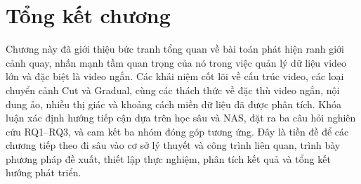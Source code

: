 \section{Tổng kết chương}
Chương này đã giới thiệu bức tranh tổng quan về bài toán phát hiện ranh giới cảnh quay, nhấn mạnh tầm quan trọng của nó trong việc quản lý dữ liệu video lớn và đặc biệt là video ngắn. Các khái niệm cốt lõi về cấu trúc video, các loại chuyển cảnh Cut và Gradual, cùng các thách thức về đặc thù video ngắn, nội dung ảo, nhiễu thị giác và khoảng cách miền dữ liệu đã được phân tích. Khóa luận xác định hướng tiếp cận dựa trên học sâu và NAS, đặt ra ba câu hỏi nghiên cứu RQ1--RQ3, và cam kết ba nhóm đóng góp tương ứng. Đây là tiền đề để các chương tiếp theo đi sâu vào cơ sở lý thuyết và công trình liên quan, trình bày phương pháp đề xuất, thiết lập thực nghiệm, phân tích kết quả và tổng kết hướng phát triển.

